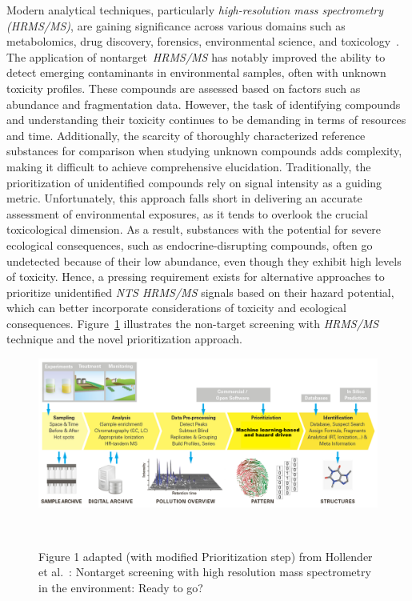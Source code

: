  Modern analytical techniques, particularly \emph{high-resolution mass spectrometry (HRMS/MS)}, are gaining significance across various domains such as metabolomics, drug discovery, forensics, environmental science, and toxicology~\cite{tamara2022}. The application of nontarget~\emph{HRMS/MS} has notably improved the ability to detect emerging contaminants in environmental samples, often with unknown toxicity profiles. These compounds are assessed based on factors such as abundance and fragmentation data. However, the task of identifying compounds and understanding their toxicity continues to be demanding in terms of resources and time. Additionally, the scarcity of thoroughly characterized reference substances for comparison when studying unknown compounds adds complexity, making it difficult to achieve comprehensive elucidation. Traditionally, the prioritization of unidentified compounds rely on signal intensity as a guiding metric. Unfortunately, this approach falls short in delivering an accurate assessment of environmental exposures, as it tends to overlook the crucial toxicological dimension. As a result, substances with the potential for severe ecological consequences, such as endocrine-disrupting compounds, often go undetected because of their low abundance, even though they exhibit high levels of toxicity. Hence, a pressing requirement exists for alternative approaches to prioritize unidentified \emph{NTS HRMS/MS} signals based on their hazard potential, which can better incorporate considerations of toxicity and ecological consequences. Figure~\ref{fig:non_target_high_resolution_mass_spectrometry} illustrates the non-target screening with \emph{HRMS/MS} technique and the novel prioritization approach.
 
 \begin{figure}[htbp]  %
     \centering
     \includegraphics[width=1.0\textwidth]{figures/non_target_high_resolution_mass_spectrometry_1.png}  
     \caption{Figure 1 adapted (with modified Prioritization step) from Hollender et al.~\cite{hollender}: Nontarget screening with high resolution mass spectrometry in the environment: Ready to go? }
 ~\label{fig:non_target_high_resolution_mass_spectrometry} 
 \end{figure}

